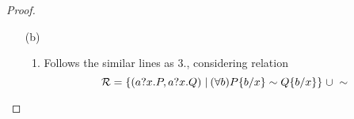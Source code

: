 \begin{proof}
\begin{itemize}
\begin{enumerate}
\item Follows similar lines, by showing that relation 
\[
{\cal R}=\{(\rest\NA\PP \sim \rest\NA\PQ) \;|\; \PP\sim \PQ\}\;\cup\; \sim
\]
is contained in $\sim$ by conduction on the definition of strong bisimulation. 
\item Follows by showing that relation 
\[
{\cal R}=\{(\send\NA\role\msg\NB.\PP , \send\NA\role\msg\NB.\PQ)\;|\; \PP\sim\PQ \}\; \cup\; \sim
\]
is contained in $\sim$ by coinduction on the definition of strong bisimulation. Notice that the pair of processes related by $\cal R$ are either in $\sim$, in which case we conclude the proof directly, or have only the same observable (the output), in which case the pair of continuing processes is in $\sim$. 
\item Follows by showing that relation
\[
{\cal R}=\{(\scope\NA\PP,\scope\NA\PQ) \;|\; \PP\sim\PQ \}\;\cup\; \sim
\]
is contained in $\sim$ by coinduction on the definition of strong bisimulation. 
Let $(\scope\NA\PP,\scope\NA\PQ)\in{\cal R}$. and let 
$$\scope\NA\PP\lts{\alpha}\PP'.$$
There are three cases for the last applied rule while deriving the latter. We detail only the case when the last applied rule is . Then, $\alpha=\tau_\omega$ and  $\scope\NA\PP\lts{\tau_\omega}\PP'$ is derived from $\PP\lts{\tau_{\omega\scope\NA}}\PP'$. By $\PP\sim\PQ$ we have that $\PQ\lts{\tau_{\omega\scope\NA}}\PQ'$, where $\PP'\sim\PQ'$. By  we have $\scope\NA\PQ\lts{\tau_\NA}\PQ'$, which finishes the proof.
\item Follows by showing that relation 
\[
{\cal R}=\{(\sauth\NA\role\msg\NB.\PP , \sauth\NA\role\msg\NB.\PQ) \;|\; \PP\sim\PQ \} \;\cup\; \sim
\]
is contained in $\sim$ by coinduction on the definition of strong bisimulation. Note that both process $\sauth\NA\role\msg\NB.\PP$ and $\sauth\NA\role\msg\NB.\PQ$ have only one observable action leading them to processes $\scope\NA\PP$ and $\scope\NA\PQ$, which are bisimilar by $\PP\sim\PQ$ and statement $4.$ of this Theorem.
\item Follows similar lines as $5.$, with witnessing relation 
\[
{\cal R}=\{(\rauth\NA\role\msg\NB.\PP , \rauth\NA\role\msg\NB.\PQ) \;|\; \PP\sim\PQ \} \;\cup\; \sim
\]
\end{enumerate}
\item [(b)]
\begin{enumerate}
\item Follows the similar lines as $3.$, considering relation 
\[
{\cal R}=\{(a?x.P, a?x.Q) \;|\: (\forall b) P\{b/x\} \sim Q\{b/x\}\}\;\cup\; \sim
\]
\end{enumerate}
\end{itemize}
\end{proof}
